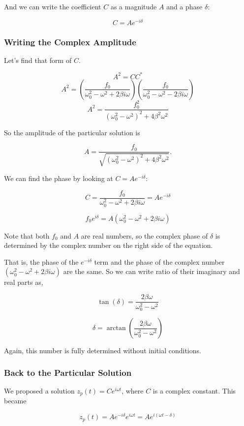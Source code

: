 \documentclass[11pt]{article}
\begin{document}
And we can write the coefficient \(C\) as a magnitude \(A\) and a phase
\(\delta\):

\[C = A e^{-i \delta}\]

\subsubsection{Writing the Complex
Amplitude}\label{writing-the-complex-amplitude}

Let's find that form of \(C\).

\[A^2 = CC^*\]
\[A^2 = \left(\dfrac{f_0}{\omega_0^2 - \omega^2 + 2\beta i \omega}\right) \left(\dfrac{f_0}{\omega_0^2 - \omega^2 - 2\beta i \omega}\right)\]
\[A^2 = \dfrac{f_0^2}{\left(\omega_0^2 - \omega^2\right)^2 + 4\beta^2 \omega^2}\]

So the amplitude of the particular solution is

\[A = \dfrac{f_0}{\sqrt{\left(\omega_0^2 - \omega^2\right)^2 + 4\beta^2 \omega^2}}.\]

We can find the phase by looking at \(C= A e^{-i \delta}\):

\[C = \dfrac{f_0}{\omega_0^2 - \omega^2 + 2\beta i \omega} = A e^{-i \delta}\]

\[f_0e^{i\delta} = A \left(\omega_0^2 - \omega^2 + 2\beta i \omega\right)\]

Note that both \(f_0\) and \(A\) are real numbers, so the complex phase
of \(\delta\) is determined by the complex number on the right side of
the equation.

That is, the phase of the \(e^{-i\delta}\) term and the phase of the
complex number \(\left(\omega_0^2 - \omega^2 + 2\beta i \omega\right)\)
are the same. So we can write ratio of their imaginary and real parts
as,

\[\tan(\delta) = \dfrac{2\beta \omega}{\omega_0^2 - \omega^2}\]

\[\delta = \arctan\left(\dfrac{2\beta \omega}{\omega_0^2 - \omega^2}\right)\]

Again, this number is fully determined without initial conditions.

\subsubsection{Back to the Particular
Solution}\label{back-to-the-particular-solution}

We proposed a solution \(z_p(t) = C e^{i \omega t}\), where \(C\) is a
complex constant. This became

\[z_p(t) = A e^{-i \delta} e^{i \omega t} = A e^{i(\omega t - \delta)}\]
\end{document}

